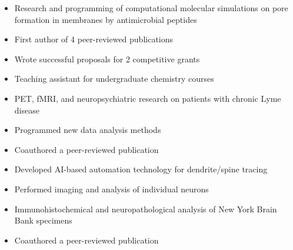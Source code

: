 \documentclass[10pt,a4paper]{altacv}
\begin{document}
\divider

\begin{itemize}
\item Research and programming of computational molecular simulations on pore formation in membranes by antimicrobial peptides 
\item First author of 4 peer-reviewed publications
\item Wrote successful proposals for 2 competitive grants
\item Teaching assistant for undergraduate chemistry courses
\end{itemize}

\divider

\begin{itemize}
\item PET, fMRI, and neuropsychiatric research on patients with chronic Lyme disease
\item Programmed new data analysis methods
\item Coauthored a peer-reviewed publication
\end{itemize}

\divider

\begin{itemize}
\item Developed AI-based automation technology for dendrite/spine tracing
\item Performed imaging and analysis of individual neurons
\item Immunohistochemical and neuropathological analysis of New York Brain Bank specimens
\item Coauthored a peer-reviewed publication
\end{itemize}




\end{document}
